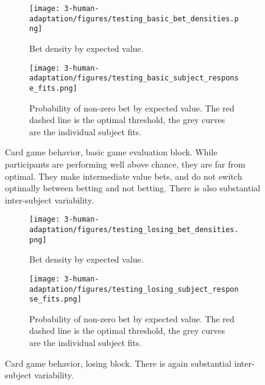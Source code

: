 \begin{figure}
\centering
\begin{subfigure}[t]{0.5\textwidth}
\texttt{[image: 3-human-adaptation/figures/testing\_basic\_bet\_densities.png]}
\caption{Bet density by expected value.}
\end{subfigure}%
\begin{subfigure}[t]{0.5\textwidth}
\texttt{[image: 3-human-adaptation/figures/testing\_basic\_subject\_response\_fits.png]}
\caption{Probability of non-zero bet by expected value. The red dashed line is the optimal threshold, the grey curves are the individual subject fits.}
\end{subfigure}%
\caption{Card game behavior, basic game evaluation block. While participants are performing well above chance, they are far from optimal. They make intermediate value bets, and do not switch optimally between betting and not betting. There is also substantial inter-subject variability.} \label{fig:human_cards_basic_results}
\end{figure}
\begin{figure}
\centering
\begin{subfigure}[t]{0.5\textwidth}
\texttt{[image: 3-human-adaptation/figures/testing\_losing\_bet\_densities.png]}
\caption{Bet density by expected value.}
\end{subfigure}%
\begin{subfigure}[t]{0.5\textwidth}
\texttt{[image: 3-human-adaptation/figures/testing\_losing\_subject\_response\_fits.png]}
\caption{Probability of non-zero bet by expected value. The red dashed line is the optimal threshold, the grey curves are the individual subject fits.}
\end{subfigure}%
\caption{Card game behavior, losing block. There is again substantial inter-subject variability.} \label{fig:human_cards_losing_results}
\end{figure}


